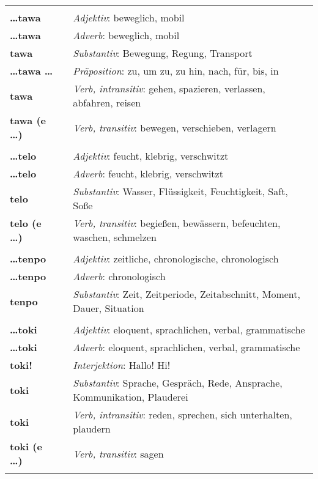 \begin{supertabular}{p{2,5cm}|ll}
 && \\ %
\textbf{\dots tawa} && \textit{Adjektiv}: beweglich, mobil \\ 
\textbf{\dots tawa} && \textit{Adverb}: beweglich, mobil \\ 
\textbf{tawa} && \textit{Substantiv}: Bewegung, Regung, Transport \\ 
\textbf{\dots tawa \dots} && \textit{Präposition}: zu, um zu, zu hin, nach, für, bis, in \\ 
\textbf{tawa} && \textit{Verb, intransitiv}: gehen, spazieren, verlassen, abfahren, reisen \\ 
\textbf{tawa (e \dots)} && \textit{Verb, transitiv}: bewegen, verschieben, verlagern \\ 
 && \\ %
\textbf{\dots telo} && \textit{Adjektiv}: feucht, klebrig, verschwitzt \\ 
\textbf{\dots telo} && \textit{Adverb}: feucht, klebrig, verschwitzt \\ 
\textbf{telo} && \textit{Substantiv}: Wasser, Flüssigkeit, Feuchtigkeit, Saft, Soße \\ 
\textbf{telo (e \dots)} && \textit{Verb, transitiv}: begießen, bewässern, befeuchten, waschen, schmelzen \\ 
 && \\ %
\textbf{\dots tenpo} && \textit{Adjektiv}: zeitliche, chronologische, chronologisch \\ 
\textbf{\dots tenpo} && \textit{Adverb}: chronologisch \\ 
\textbf{tenpo} && \textit{Substantiv}: Zeit, Zeitperiode, Zeitabschnitt, Moment, Dauer, Situation \\ 
 && \\ %
\textbf{\dots toki} && \textit{Adjektiv}: eloquent, sprachlichen, verbal, grammatische \\ 
\textbf{\dots toki} && \textit{Adverb}: eloquent, sprachlichen, verbal, grammatische \\ 
\textbf{toki!} && \textit{Interjektion}: Hallo! Hi! \\ 
\textbf{toki} && \textit{Substantiv}: Sprache, Gespräch, Rede, Ansprache, Kommunikation, Plauderei \\ 
\textbf{toki} && \textit{Verb, intransitiv}: reden, sprechen, sich unterhalten, plaudern \\ 
\textbf{toki (e \dots)} && \textit{Verb, transitiv}: sagen \\ 
 && \\ %

\end{supertabular}
